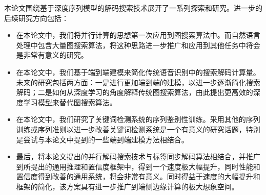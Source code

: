 本论文围绕基于深度序列模型的解码搜索技术展开了一系列探索和研究。进一步的后续研究方向包括：
\begin{itemize}
	\item 在本论文中，我们将并行计算的思想第一次应用到图搜索算法中。而自然语言处理中包含大量图搜索算法，将这种思路进一步推广和应用到其他任务中将会是非常有意义的研究。
	\item 在本论文中，我们基于端到端建模来简化传统语音识别中的搜索解码计算量。未来的研究包括两方面：一是进行更加端到端的建模，以进一步逐渐简化搜索解码；二是如何从深度学习的角度解释传统图搜索算法，由此提出更高效的深度学习模型来替代图搜索算法。
	\item 在本论文中，我们研究了关键词检测系统的序列鉴别性训练。采用其他的序列训练或序列准则以进一步改善关键词检测系统是一个有意义的研究话题，特别是尝试与本论文中提到的一些端到端建模方法相结合。
	\item 最后，将本论文提出的并行解码搜索技术与标签同步解码算法相结合，并推广到所提出的通用推理和置信度框架中，得到一个速度极大幅提升，同时性能和置信度得到改善的通用系统，将会非常有意义。同时得益于速度的大幅提升和框架的简化，该方案具有进一步推广到端侧边缘计算的极大想象空间。
\end{itemize}

